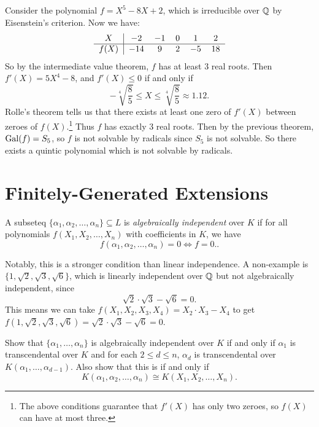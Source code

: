 \begin{example}
  Consider the polynomial $f = X^5 - 8X + 2$, which
  is irreducible over $\mathbb{Q}$ by Eisenstein's criterion.
  Now we have:
  \[
    \begin{tabular}
      {c|ccccc}
      $X$ & $-2$ & $-1$ & $0$ & $1$ & $2$ \\
      \hline
      $f(X)$ & $-14$ & $9$ & $2$ & $-5$ & $18$
    \end{tabular}
  \]
  So by the intermediate value theorem, $f$ has
  at least $3$ real roots. Then $f'(X) = 5X^4 - 8$, and
  $f'(X) \le 0$ if and only if
  \[
    -\sqrt[4]{\frac{8}{5}} \le X \le \sqrt[4]{\frac{8}{5}}
    \approx 1.12.
  \]
  Rolle's theorem tells us that there exists at least
  one zero of $f'(X)$ between zeroes of $f(X)$.\footnote{The above conditions guarantee that $f'(X)$ has only two zeroes, so $f(X)$ can have at most three.} Thus
  $f$ has exactly $3$ real roots. Then by the previous
  theorem, $\operatorname{Gal}(f) = S_5$, so $f$ is not solvable
  by radicals since $S_5$ is not solvable. So there
  exists a quintic polynomial which is not solvable
  by radicals.
\end{example}

\section{Finitely-Generated Extensions}

\begin{definition}
  A subseteq $\{\alpha_1, \alpha_2, \dots, \alpha_n\} \subseteq L$
  is \emph{algebraically independent} over $K$ if
  for all polynomials $f(X_1, X_2, \dots, X_n)$ with
  coefficients in $K$, we have
  \[
    f(\alpha_1, \alpha_2, \dots, \alpha_n) = 0
    \iff f = 0..
  \]
\end{definition}

\begin{example}
  Notably, this is a stronger condition than linear
  independence. A non-example is
  $\{1, \sqrt{2}, \sqrt{3}, \sqrt{6}\}$, which is linearly
  independent over $\mathbb{Q}$ but not algebraically independent,
  since
  \[
    \sqrt{2} \cdot \sqrt{3} - \sqrt{6} = 0.
  \]
  This means we can take $f(X_1, X_2, X_3, X_4) = X_2 \cdot X_3 - X_4$ to
  get $f(1, \sqrt{2}, \sqrt{3}, \sqrt{6}) = \sqrt{2} \cdot \sqrt{3} - \sqrt{6} = 0$.
\end{example}

\begin{exercise}
  Show that $\{\alpha_1, \dots, \alpha_n\}$  is algebraically
  independent over $K$ if and only if
  $\alpha_1$ is transcendental over $K$ and for each
  $2 \le d \le n$, $\alpha_d$ is transcendental over
  $K(\alpha_1, \dots, \alpha_{d - 1})$. Also show that
  this is if and only if
  \[
    K(\alpha_1, \alpha_2, \dots, \alpha_n) \cong K(X_1, X_2, \dots, X_n).
  \]
\end{exercise}

